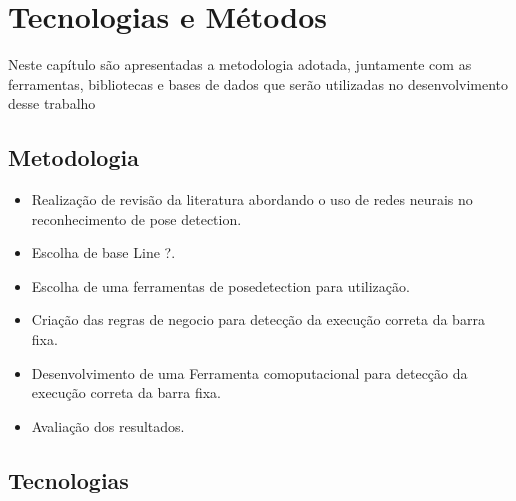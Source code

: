 \chapter{Tecnologias e Métodos}
Neste capítulo são apresentadas a metodologia adotada, juntamente com as ferramentas, bibliotecas e bases de dados que serão utilizadas no desenvolvimento desse trabalho

\section[Metodologia]{Metodologia}


 \begin{itemize}
   \item Realização de revisão da literatura abordando o uso de redes neurais no reconhecimento de pose detection.  
   \item Escolha de base Line ?.
   \item Escolha de uma ferramentas de posedetection para utilização.
   \item Criação das regras de negocio para detecção da execução correta da barra fixa.
   \item Desenvolvimento de uma Ferramenta comoputacional para detecção da execução correta da barra fixa.
   \item  Avaliação dos resultados.
 \end{itemize}


\section[Tecnologias]{Tecnologias}
